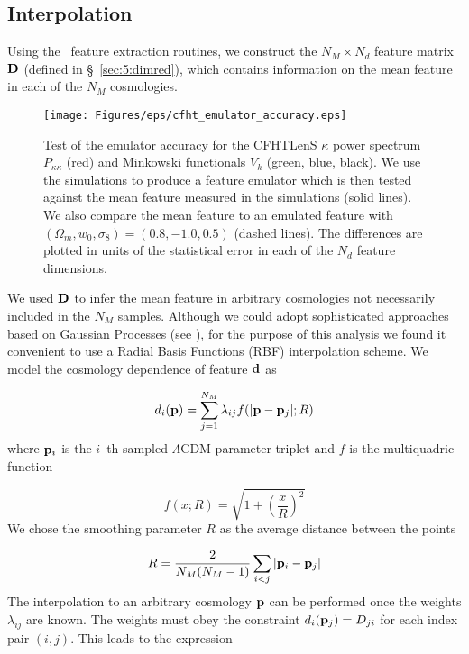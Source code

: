 \subsection{Interpolation}
Using the \LT\, feature extraction routines, we construct the $N_M\times N_d$ feature matrix $\mathbf{D}$ (defined in \S~\ref{sec:5:dimred}), which contains information on the mean feature in each of the $N_M$ cosmologies. 
%
\begin{figure}
\begin{center}
\texttt{[image: Figures/eps/cfht\_emulator\_accuracy.eps]}
\end{center}
\caption{Test of the emulator accuracy for the CFHTLenS $\kappa$ power spectrum $P_{\kappa\kappa}$ (red) and Minkowski functionals $V_k$ (green, blue, black). We use the  simulations to produce a feature emulator which is then tested against the mean feature measured in the  simulations (solid lines). We also compare the mean  feature to an emulated feature with $(\Omega_m,w_0,\sigma_8)=(0.8,-1.0,0.5)$ (dashed lines). The differences are plotted in units of the statistical error in each of the $N_d$ feature dimensions.}
\label{fig:6:interpolation}
\end{figure}
%
We used $\mathbf{D}$ to infer the mean feature in arbitrary cosmologies not necessarily included in the $N_M$ samples. Although we could adopt sophisticated approaches based on Gaussian Processes (see \citep{Coyote2}), for the purpose of this analysis we found it convenient to use a Radial Basis Functions (RBF) interpolation scheme. We model the cosmology dependence of feature $\mathbf{d}$ as

\begin{equation}
\label{eq:6:rbf}
d_i(\mathbf{p}) = \sum_{j=1}^{N_M} \lambda_{ij}f(\vert\mathbf{p}-\mathbf{p}_j\vert;R)
\end{equation}  
%
where $\mathbf{p}_i$ is the $i$--th sampled $\Lambda$CDM parameter triplet and $f$ is the multiquadric function

\begin{equation}
\label{eq:6:multiquadric}
f(x;R) = \sqrt{1+\left(\frac{x}{R}\right)^2}
\end{equation}
%
We chose the smoothing parameter $R$ as the average distance between the  points

\begin{equation}
\label{eq:6:scale}
R = \frac{2}{N_M(N_M-1)}\sum_{i<j}\vert\mathbf{p}_i-\mathbf{p}_j\vert
\end{equation} 
%
The interpolation to an arbitrary cosmology $\mathbf{p}$ can be performed once the weights $\lambda_{ij}$ are known. The weights must obey the constraint $d_i(\mathbf{p}_j) = D_{ji}$ for each index pair $(i,j)$. This leads to the expression  

